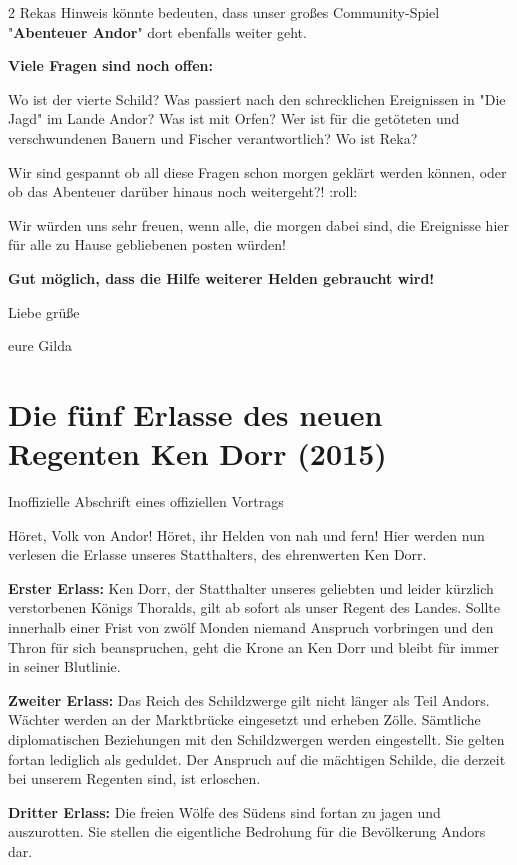 \documentclass[10pt, a4paper, oneside]{book}
\newcommand{\storytext}[2][]{%
        \section{#2}%
        \label{storytext-#1}%
    }
\newcommand{\fillbreak}{\vspace*{\fill}\columnbreak}
\begin{document}
\begin{multicols}{2}
Rekas Hinweis könnte bedeuten, dass unser großes Community-Spiel "\textbf{Abenteuer Andor}" dort ebenfalls weiter geht.

\textbf{Viele Fragen sind noch offen:}

Wo ist der vierte Schild? Was passiert nach den schrecklichen Ereignissen in "Die Jagd" im Lande Andor? Was ist mit Orfen? Wer ist für die getöteten und verschwundenen Bauern und Fischer verantwortlich? Wo ist Reka?

Wir sind gespannt ob all diese Fragen schon morgen geklärt werden können, oder ob das Abenteuer darüber hinaus noch weitergeht?! :roll:

Wir würden uns sehr freuen, wenn alle, die morgen dabei sind, die Ereignisse hier für alle zu Hause gebliebenen posten würden!

\textbf{Gut möglich, dass die Hilfe weiterer Helden gebraucht wird!}


Liebe grüße

eure Gilda



\fillbreak
\storytext[2015-die-fuenf-erlasse-des-neuen-regenten-ken-dorr]{Die fünf Erlasse des neuen Regenten Ken Dorr (2015)}

\begin{center}
    Inoffizielle Abschrift eines offiziellen Vortrags
\end{center}

Höret, Volk von Andor! Höret, ihr Helden von nah und fern! Hier werden nun verlesen die Erlasse unseres Statthalters, des ehrenwerten Ken Dorr.

\textbf{Erster Erlass:} Ken Dorr, der Statthalter unseres geliebten und leider kürzlich verstorbenen Königs Thoralds, gilt ab sofort als unser Regent des Landes. Sollte innerhalb einer Frist von zwölf Monden niemand Anspruch vorbringen und den Thron für sich beanspruchen, geht die Krone an Ken Dorr und bleibt für immer in seiner Blutlinie.

\textbf{Zweiter Erlass:} Das Reich des Schildzwerge gilt nicht länger als Teil Andors. Wächter werden an der Marktbrücke eingesetzt und erheben Zölle. Sämtliche diplomatischen Beziehungen mit den Schildzwergen werden eingestellt. Sie gelten fortan lediglich als geduldet. Der Anspruch auf die mächtigen Schilde, die derzeit bei unserem Regenten sind, ist erloschen.

\textbf{Dritter Erlass:} Die freien Wölfe des Südens sind fortan zu jagen und auszurotten. Sie stellen die eigentliche Bedrohung für die Bevölkerung Andors dar.


\end{multicols}
\end{document}
